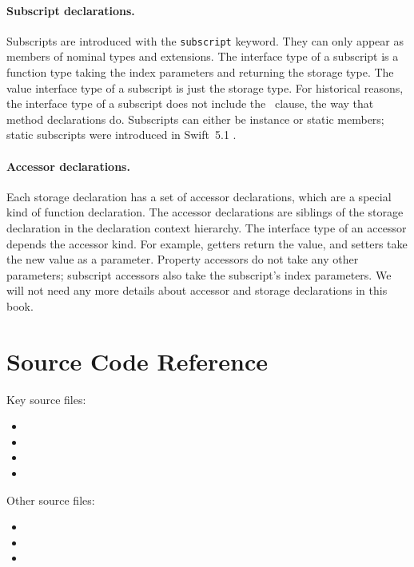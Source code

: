 \documentclass[../generics]{subfiles}
\begin{document}
\paragraph{Subscript declarations.} Subscripts are introduced with the \texttt{subscript} keyword. They can only appear as members of nominal types and extensions. The interface type of a subscript is a function type taking the index parameters and returning the storage type. The value interface type of a subscript is just the storage type. For historical reasons, the interface type of a subscript does not include the \tSelf\ clause, the way that method declarations do. Subscripts can either be instance or static members; static subscripts were introduced in Swift~5.1 \cite{se0254}.

\paragraph{Accessor declarations.}
Each storage declaration has a set of accessor declarations, which are a special kind of function declaration. The accessor declarations are siblings of the storage declaration in the declaration context hierarchy. The interface type of an accessor depends the accessor kind. For example, getters return the value, and setters take the new value as a parameter. Property accessors do not take any other parameters; subscript accessors also take the subscript's index parameters. We will not need any more details about accessor and storage declarations in this book.

\section{Source Code Reference}\label{declarationssourceref}

Key source files:
\begin{itemize}
\item {}
\item {}
\item {}
\item {}
\end{itemize}
Other source files:
\begin{itemize}
\item {}
\item {}
\item {}
\end{itemize}
\end{document}

